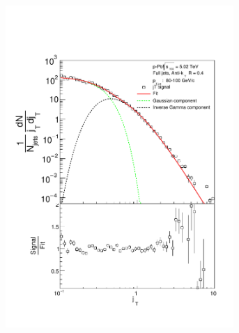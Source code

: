 \begin{figure}
\begin{subfigure}{0.24\textwidth}
\includegraphics[width=0.95\textwidth]{results/JetConejTSignalFit/JetConejTSignalFitNFin00JetPt06perconeBgBayes}
\end{subfigure}
\begin{subfigure}{0.24\textwidth}

\end{subfigure}
\end{figure}
